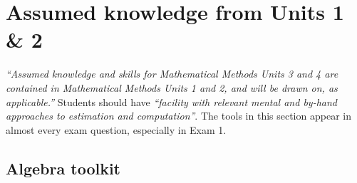 \section{Assumed knowledge from Units 1 \& 2}
\label{sec:assumed}

\begin{sdbox}
\emph{``Assumed knowledge and skills for Mathematical Methods Units 3 and 4 are contained in Mathematical Methods Units 1 and 2, and will be drawn on, as applicable.''} Students should have \emph{``facility with relevant mental and by-hand approaches to estimation and computation''}. The tools in this section appear in almost every exam question, especially in Exam 1.
\end{sdbox}

\subsection{Algebra toolkit}


